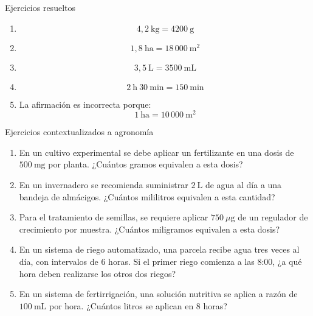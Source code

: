 \documentclass[aspectratio=169,10pt]{beamer}
\begin{document}
	\begin{frame}{Ejercicios resueltos}
		\small
		\begin{enumerate}[<+->]
			\item \[
			4{,}2\ \text{kg} = 4200\ \text{g}
			\]
			
			\item \[
			1{,}8\ \text{ha} = 18\,000\ \text{m}^2
			\]
			
			\item \[
			3{,}5\ \text{L} = 3500\ \text{mL}
			\]
			
			\item \[
			2\ \text{h}\ 30\ \text{min} = 150\ \text{min}
			\]
			
			\item La afirmación es incorrecta porque:
			\[
			1\ \text{ha} = 10\,000\ \text{m}^2
			\]
		\end{enumerate}
	\end{frame}
	
	\begin{frame}{Ejercicios contextualizados a agronomía}
		\small
		\begin{enumerate}[<+->]
			\item En un cultivo experimental se debe aplicar un fertilizante en una dosis de \(500\ \text{mg}\) por planta. ¿Cuántos gramos equivalen a esta dosis?
			\item En un invernadero se recomienda suministrar \(2\ \text{L}\) de agua al día a una bandeja de almácigos. ¿Cuántos mililitros equivalen a esta cantidad?
			\item Para el tratamiento de semillas, se requiere aplicar \(750\ \mu\text{g}\) de un regulador de crecimiento por muestra. ¿Cuántos miligramos equivalen a esta dosis?
			\item En un sistema de riego automatizado, una parcela recibe agua tres veces al día, con intervalos de 6 horas. Si el primer riego comienza a las 8:00, ¿a qué hora deben realizarse los otros dos riegos?
			\item En un sistema de fertirrigación, una solución nutritiva se aplica a razón de \(100\ \text{mL}\) por hora. ¿Cuántos litros se aplican en 8 horas?
		\end{enumerate}
	\end{frame}
	
\end{document}
